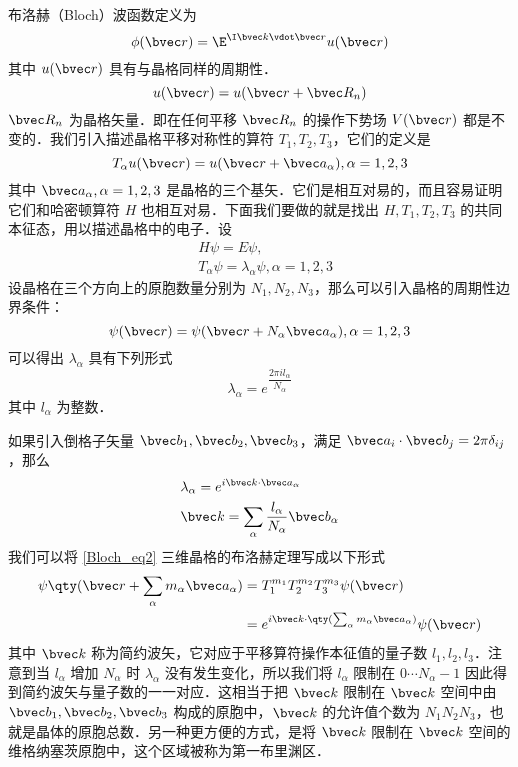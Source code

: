 \cite{黄昆}\cite{Bransden}布洛赫（Bloch）波函数定义为
\begin{equation}\label{Bloch_eq2}
\phi(\bvec r) = \E^{\I \bvec k \vdot \bvec r} u(\bvec r)
\end{equation}
其中 $u(\bvec r)$ 具有与晶格同样的周期性．
\begin{equation}
u(\bvec r)=u(\bvec r+\bvec R_n)
\end{equation}
$\bvec R_n$ 为晶格矢量．即在任何平移 $\bvec R_n$ 的操作下势场 $V(\bvec r)$ 都是不变的．我们引入描述晶格平移对称性的算符 $T_1,T_2,T_3$，它们的定义是
\begin{equation}
T_\alpha u(\bvec r)= u(\bvec r+\bvec a_\alpha),\alpha=1,2,3
\end{equation}
其中 $\bvec a_\alpha,\alpha=1,2,3$ 是晶格的三个基矢．它们是相互对易的，而且容易证明它们和哈密顿算符 $H$ 也相互对易．下面我们要做的就是找出 $H,T_1,T_2,T_3$ 的共同本征态，用以描述晶格中的电子．设
\begin{equation}
\begin{aligned}
&H\psi=E\psi,\\
&T_\alpha \psi = \lambda_\alpha \psi, \alpha=1,2,3
\end{aligned}
\end{equation}
设晶格在三个方向上的原胞数量分别为 $N_1,N_2,N_3$，那么可以引入晶格的周期性边界条件：
\begin{equation}
\psi(\bvec r)=\psi(\bvec r+N_\alpha \bvec a_\alpha),\alpha=1,2,3
\end{equation}
可以得出 $\lambda_\alpha$ 具有下列形式
\begin{equation}
\lambda_\alpha=e^{ \dfrac{2\pi i l_\alpha}{N_\alpha}}
\end{equation}
其中 $l_\alpha$ 为整数．

如果引入倒格子矢量 $\bvec b_1,\bvec b_2,\bvec b_3$，满足 $\bvec a_i \cdot \bvec b_j = 2\pi \delta_{ij}$，那么
\begin{equation}
\begin{aligned}
&\lambda_\alpha = e^{i \bvec k \cdot \bvec a_\alpha}\\
&\bvec k=\sum_\alpha\frac{l_\alpha}{N_\alpha} \bvec b_\alpha
\end{aligned}
\end{equation}
我们可以将 \autoref{Bloch_eq2} 三维晶格的布洛赫定理写成以下形式
\begin{equation}
\begin{aligned}
\psi\qty(\bvec r+\sum_\alpha m_\alpha\bvec a_\alpha) &= T_1^{m_1} T_2^{m_2} T_3^{m_3} \psi(\bvec r)\\
&=e^{i\bvec k\cdot \qty(\sum_\alpha m_\alpha\bvec a_\alpha)}\psi(\bvec r)
\end{aligned}
\end{equation}
其中 $\bvec k$ 称为简约波矢，它对应于平移算符操作本征值的量子数 $l_1,l_2,l_3$．注意到当 $l_\alpha$ 增加 $N_\alpha$ 时 $\lambda_\alpha$ 没有发生变化，所以我们将 $l_\alpha$ 限制在 $0\cdots N_\alpha-1$ 因此得到简约波矢与量子数的一一对应．这相当于把 $\bvec k$ 限制在 $\bvec k$ 空间中由 $\bvec b_1,\bvec b_2,\bvec b_3$ 构成的原胞中，$\bvec k$ 的允许值个数为 $N_1N_2N_3$，也就是晶体的原胞总数．另一种更方便的方式，是将 $\bvec k$ 限制在 $\bvec k$ 空间的维格纳塞茨原胞中，这个区域被称为第一布里渊区．